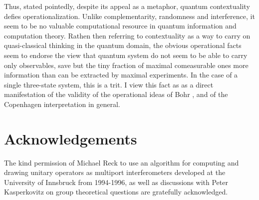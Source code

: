\documentclass[prl,showpacs,showkeys,amsfonts]{revtex4}
\begin{document}
Thus, stated pointedly, despite its appeal as a metaphor,
quantum contextuality defies operationalization.
Unlike complementarity,
randomness and interference, it seem to be no valuable computational resource
in quantum information and computation theory.
Rathen then referring to contextuality as a way to carry on quasi-classical thinking
in the quantum domain, the obvious operational facts
seem to endorse the view that quantum system do not seem to be able to carry only
observables,
save but the tiny fraction of maximal comeasurable ones
more information than can be extracted by maximal experiments.
In the case of a single three-state system, this is a trit.
I view this fact as as a direct manifestation of the validity of the
operational ideas of Bohr \cite{zukowski-97}, and of the
Copenhagen interpretation in general.

\section*{Acknowledgements}
The kind permission of Michael Reck to
use an algorithm for computing and drawing
unitary operators as multiport interferometers
developed at the University of Innsbruck from 1994-1996, as well as
discussions with Peter Kasperkovitz on group theoretical questions
are gratefully acknowledged.


%
%
%
%
\end{document}
